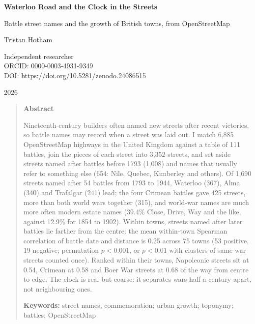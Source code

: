 \documentclass[11pt,a4paper]{article}
\begin{document}
\begin{center}
{\Large\bfseries Waterloo Road and the Clock in the Streets\par}
\vspace{0.4em}
{\large Battle street names and the growth of British towns, from OpenStreetMap\par}
\vspace{1.2em}
{\large Tristan Hotham\par}
\vspace{0.3em}
{\small Independent researcher\\
ORCID: 0000-0003-4931-9349\\
DOI: https://doi.org/10.5281/zenodo.24086515\par}
\vspace{0.8em}
2026
\end{center}

\begin{quote}
\small
\begin{center}\textbf{Abstract}\end{center}
Nineteenth-century builders often named new streets after recent victories, so battle names may record when a street was laid out. I match 6,885 OpenStreetMap highways in the United Kingdom against a table of 111 battles, join the pieces of each street into 3,352 streets, and set aside streets named after battles before 1793 (1,008) and names that usually refer to something else (654: Nile, Quebec, Kimberley and others). Of 1,690 streets named after 54 battles from 1793 to 1944, Waterloo (367), Alma (340) and Trafalgar (241) lead; the four Crimean battles gave 425 streets, more than both world wars together (315), and world-war names are much more often modern estate names (39.4\% Close, Drive, Way and the like, against 12.9\% for 1854 to 1902). Within towns, streets named after later battles lie farther from the centre: the mean within-town Spearman correlation of battle date and distance is 0.25 across 75 towns (53 positive, 19 negative; permutation $p<0.001$, or $p<0.01$ with clusters of same-war streets counted once). Ranked within their towns, Napoleonic streets sit at 0.54, Crimean at 0.58 and Boer War streets at 0.68 of the way from centre to edge. The clock is real but coarse: it separates wars half a century apart, not neighbouring ones.

\textbf{Keywords:} street names; commemoration; urban growth; toponymy; battles; OpenStreetMap
\end{quote}
\end{document}
